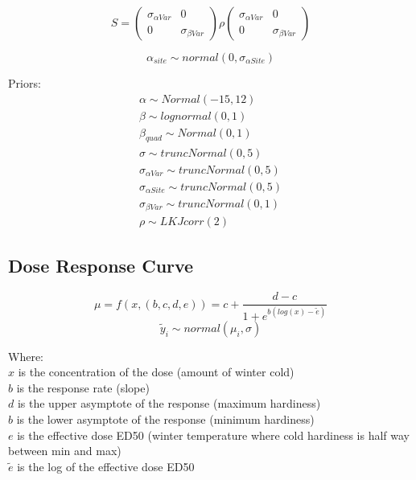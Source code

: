 \documentclass[11pt,letter]{article}
\begin{document}
\begin{equation*}
S = 
\begin{pmatrix}
\sigma_{\alpha Var} & 0 \\
0 & \sigma_{\beta Var} 
\end{pmatrix}
\rho
\begin{pmatrix}
\sigma_{\alpha Var} & 0 \\
0 & \sigma_{\beta Var} 
\end{pmatrix}
\end{equation*}

\begin{equation*}
\alpha_{site} \sim normal(0, \sigma_{\alpha Site}) 
\end{equation*}

Priors:
\begin{gather*}
\alpha \sim Normal(-15, 12)\\
\beta \sim lognormal(0,1)\\
\beta_{quad} \sim Normal(0,1)\\
\sigma \sim truncNormal(0,5)\\
\sigma_{\alpha Var} \sim truncNormal(0,5)\\
\sigma_{\alpha Site} \sim truncNormal(0,5)\\
\sigma_{\beta Var} \sim truncNormal(0,1)\\
\rho \sim LKJcorr (2)
\end{gather*}

\subsection{Dose Response Curve}

\begin{equation*}
\mu=f(x,(b,c,d,e))=c+\frac{d-c}{1+e^{b(log(x)-\tilde{e})}}
\end{equation*}
\begin{equation*}
\tilde{y}_{i}\sim normal(\mu_{i},\sigma)
\end{equation*}

Where:\\
	$x$ is the concentration of the dose (amount of winter cold) \\
	$b$ is the response rate (slope)\\
	$d$ is the upper asymptote of the response (maximum hardiness)\\
	$b$ is the lower asymptote of the response (minimum hardiness)\\
	$e$ is the effective dose ED50 (winter temperature where cold hardiness is half way between min and max)  \\
	$\tilde{e}$ is the log of the effective dose ED50\\
\end{document}
